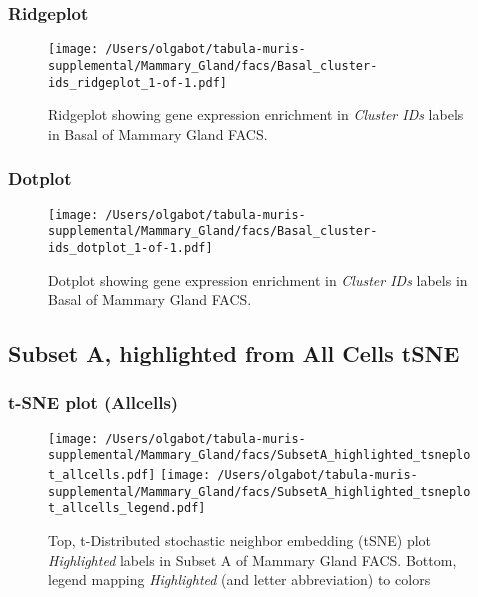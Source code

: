 \clearpage

\subsubsection{Ridgeplot}
\begin{figure}[h]
\centering
\texttt{[image: /Users/olgabot/tabula-muris-supplemental/Mammary\_Gland/facs/Basal\_cluster-ids\_ridgeplot\_1-of-1.pdf]}

\caption{ Ridgeplot  showing gene expression enrichment in \emph{Cluster IDs} labels in Basal of Mammary Gland FACS. }
\end{figure}


\clearpage

\subsubsection{Dotplot}
\begin{figure}[h]
\centering
\texttt{[image: /Users/olgabot/tabula-muris-supplemental/Mammary\_Gland/facs/Basal\_cluster-ids\_dotplot\_1-of-1.pdf]}

\caption{ Dotplot  showing gene expression enrichment in \emph{Cluster IDs} labels in Basal of Mammary Gland FACS. }
\end{figure}


\clearpage

\subsection{Subset A, highlighted from All Cells tSNE}

\subsubsection{t-SNE plot (Allcells)}
\begin{figure}[h]
\centering
\texttt{[image: /Users/olgabot/tabula-muris-supplemental/Mammary\_Gland/facs/SubsetA\_highlighted\_tsneplot\_allcells.pdf]}
\texttt{[image: /Users/olgabot/tabula-muris-supplemental/Mammary\_Gland/facs/SubsetA\_highlighted\_tsneplot\_allcells\_legend.pdf]}
\caption{Top, t-Distributed stochastic neighbor embedding (tSNE) plot  \emph{Highlighted} labels in Subset A of Mammary Gland FACS. Bottom, legend mapping \emph{Highlighted} (and letter abbreviation) to colors}
\end{figure}


\clearpage

